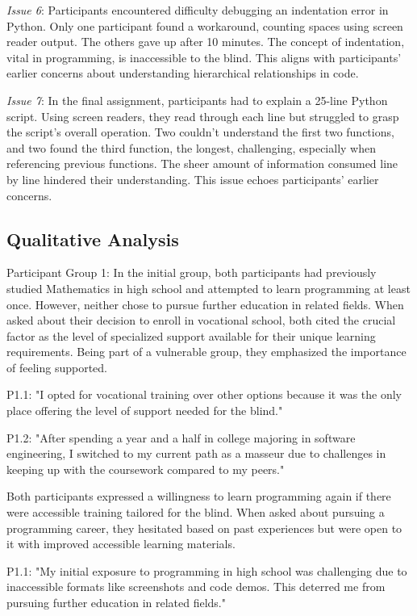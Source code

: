 {\em Issue 6}: Participants encountered difficulty debugging an indentation error in Python. Only one participant found a workaround, counting spaces using screen reader output. The others gave up after 10 minutes. The concept of indentation, vital in programming, is inaccessible to the blind. This aligns with participants' earlier concerns about understanding hierarchical relationships in code.

{\em Issue 7}: In the final assignment, participants had to explain a 25-line Python script. Using screen readers, they read through each line but struggled to grasp the script's overall operation. Two couldn't understand the first two functions, and two found the third function, the longest, challenging, especially when referencing previous functions. The sheer amount of information consumed line by line hindered their understanding. This issue echoes participants' earlier concerns.

\subsection{Qualitative Analysis}


Participant Group 1: In the initial group, both participants had previously studied Mathematics in high school and attempted to learn programming at least once. However, neither chose to pursue further education in related fields. When asked about their decision to enroll in vocational school, both cited the crucial factor as the level of specialized support available for their unique learning requirements. Being part of a vulnerable group, they emphasized the importance of feeling supported.

P1.1: "I opted for vocational training over other options because it was the only place offering the level of support needed for the blind."

P1.2: "After spending a year and a half in college majoring in software engineering, I switched to my current path as a masseur due to challenges in keeping up with the coursework compared to my peers."

Both participants expressed a willingness to learn programming again if there were accessible training tailored for the blind. When asked about pursuing a programming career, they hesitated based on past experiences but were open to it with improved accessible learning materials.

P1.1: "My initial exposure to programming in high school was challenging due to inaccessible formats like screenshots and code demos. This deterred me from pursuing further education in related fields."

